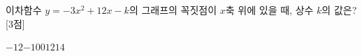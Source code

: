 이차함수 $y=-3x^2+12x-k$의 그래프의 꼭짓점이 $x$축 위에 있을 때, 상수 $k$의 값은? \mbox{[3점]}
\begin{choices32}{$-12$}{$-10$}{$0$}{$12$}{$14$}\end{choices32}
